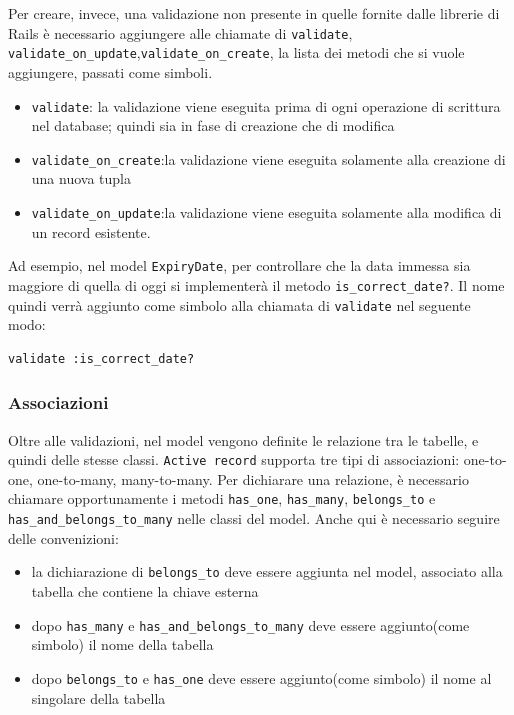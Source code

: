 \documentclass[11pt,a4paper]{article}
\begin{document}
Per creare, invece, una validazione non presente in quelle fornite dalle librerie di Rails è necessario aggiungere alle chiamate di \verb|validate|,\\ \verb|validate_on_update|,\verb|validate_on_create|, la lista dei metodi che si vuole aggiungere, passati come simboli.
\begin{itemize}
 \item \verb|validate|: la validazione viene eseguita prima di ogni operazione di scrittura nel database; quindi sia in fase di creazione che di modifica
 \item \verb|validate_on_create|:la validazione viene eseguita solamente alla creazione di una nuova tupla
 \item \verb|validate_on_update|:la validazione viene eseguita solamente alla modifica di un record esistente.
\end{itemize}

Ad esempio, nel model \verb|ExpiryDate|, per controllare che la data immessa sia maggiore di quella di oggi si implementerà il metodo \verb|is_correct_date?|. Il nome quindi verrà aggiunto come simbolo alla chiamata di \verb|validate| nel seguente modo: \\
\begin{verbatim}
validate :is_correct_date?
\end{verbatim}
\subsubsection*{Associazioni}
Oltre alle validazioni, nel model vengono definite le relazione tra le tabelle, e quindi delle stesse classi. \verb|Active record| supporta tre tipi di associazioni: one-to-one, one-to-many, many-to-many.
Per dichiarare una relazione, è necessario chiamare opportunamente i metodi \verb|has_one|, \verb|has_many|, \verb|belongs_to| e \verb|has_and_belongs_to_many| nelle classi del model.
Anche qui è necessario seguire delle convenizioni:
\begin{itemize}
 \item la dichiarazione di \verb|belongs_to| deve essere aggiunta nel model, associato alla tabella che contiene la chiave esterna
 \item dopo \verb|has_many| e \verb|has_and_belongs_to_many| deve essere aggiunto(come simbolo) il nome della tabella
 \item dopo \verb|belongs_to| e \verb|has_one| deve essere aggiunto(come simbolo) il nome al singolare della tabella
\end{itemize}
\end{document}
